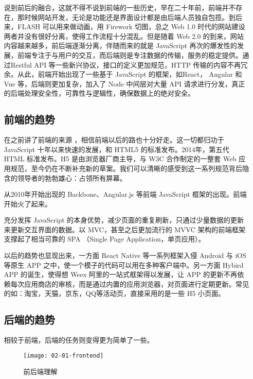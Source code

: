 说到前后的融合，这就不得不说到前端的一些历史，早在二十年前，前端并不存在，那时候网站开发，无论是功能还是界面设计都是由后端人员独自包揽。到后来，FLASH 可以用来做动画，用 Firework 切图，总之 Web 1.0 时代的网站建设两者并没有很好分离，使得工作流程十分混乱。但是随着 Web 2.0 的到来，网站内容越来越多，前后端逐渐分离，伴随而来的就是 JavaScript 再次的爆发性的发展，前端专注于与用户的交互，而后端则是专注数据的传输，服务的稳定提供。通过Restful API 等一些新兴协议，接口的定义更加规范，HTTP 传输的内容不再冗余。从此，前端开始出现了一些基于 JavaScript 的框架，如React， Angular 和 Vue
\cite{vue}
等，后端则更加复杂，加入了 Node 中间层对大量 API 请求进行分发，真正的后端处理安全性，可靠性与逻辑性，确保数据上的绝对安全。

\subsection{前端的趋势}

在之前讲了前端的来源
\cite{ruyifengfrontend}
，相信前端以后的路也十分好走。这一切都归功于 JavaScript 十年以来快速的发展，和 HTML5 的标准发布。2014年，第五代 HTML 标准发布。H5 是由浏览器厂商主导，与 W3C 合作制定的一整套 Web 应用规范，至今仍在不断补充新的草案。我们可以清晰的感受到这一系列规范背后隐含的领导者的勃勃雄心：占领所有屏幕。

从2010年开始出现的 Backbone、Angular.js 等前端 JavaScript 框架的出现。前端开始火了起来。

充分发挥 JavaScript 的本身优势，减少页面的重复刷新，只通过少量数据的更新来更新交互界面的数据。以 MVC，甚至之后更加流行的 MVVC 架构的前端框架支撑起了相当可靠的 SPA （Single Page Application，单页应用）。

以后的趋势也显现出来，一方面 React Native 等一系列框架入侵 Android 与 iOS 等原生 APP 之中，使一个模子的代码可以用在多种客户端中。另一方面 Hybird APP 的诞生，使得想 Weex 阿里的一站式框架得以发展，让 APP 的更新不再依赖每次应用商店的审核，而是通过内置的应用浏览器，对页面进行定期更新。常见的如：淘宝，天猫，京东，QQ等活动页，直接采用的是一些 H5 小页面。

\subsection{后端的趋势}

相较于前端，后端的任务则变得更为简单了一些。

\begin{figure}[htbp]
\centering
\texttt{[image: 02-01-frontend]}
\caption{前后端理解}
\label{fig:02-01-frontend}
\end{figure}

